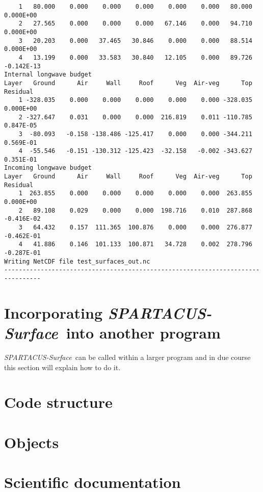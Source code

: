 \documentclass[a4,oneside]{article}
\def\spsurf{\emph{SPARTACUS-Surface}}
\def\chapter{\section}
\begin{document}
\begin{verbatim}
    1   80.000    0.000    0.000    0.000    0.000    0.000   80.000  0.000E+00
    2   27.565    0.000    0.000    0.000   67.146    0.000   94.710  0.000E+00
    3   20.203    0.000   37.465   30.846    0.000    0.000   88.514  0.000E+00
    4   13.199    0.000   33.583   30.840   12.105    0.000   89.726 -0.142E-13
Internal longwave budget
Layer   Ground      Air     Wall     Roof      Veg  Air-veg      Top   Residual
    1 -328.035    0.000    0.000    0.000    0.000    0.000 -328.035  0.000E+00
    2 -327.647    0.031    0.000    0.000  216.819    0.011 -110.785  0.847E-05
    3  -80.093   -0.158 -138.486 -125.417    0.000    0.000 -344.211  0.569E-01
    4  -55.546   -0.151 -130.312 -125.423  -32.158   -0.002 -343.627  0.351E-01
Incoming longwave budget
Layer   Ground      Air     Wall     Roof      Veg  Air-veg      Top   Residual
    1  263.855    0.000    0.000    0.000    0.000    0.000  263.855  0.000E+00
    2   89.108    0.029    0.000    0.000  198.716    0.010  287.868 -0.416E-02
    3   64.432    0.157  111.365  100.876    0.000    0.000  276.877 -0.462E-01
    4   41.886    0.146  101.133  100.871   34.728    0.002  278.796 -0.287E-01
Writing NetCDF file test_surfaces_out.nc
--------------------------------------------------------------------------------

\end{verbatim}
\normalsize

\section{Incorporating \spsurf\ into another program}
\label{sec:api}

\spsurf\ can be called within a larger program and in due course this
section will explain how to do it.

\iffalse

\chapter{Code structure}
\label{ch:structure}

\section{Objects}


\chapter{Scientific documentation}
\label{ch:science}
\end{document}
